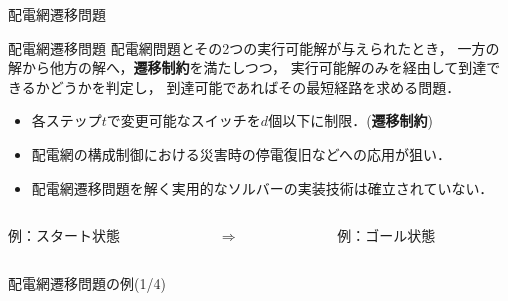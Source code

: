 \documentclass[dvipdfmx,11pt]{beamer}
\begin{document}
\begin{frame}{配電網遷移問題}
 \begin{block}{配電網遷移問題}
  配電網問題とその2つの実行可能解が与えられたとき，
  一方の解から他方の解へ，\alert{\bf 遷移制約}を満たしつつ，
  実行可能解のみを経由して到達できるかどうかを判定し，
  到達可能であればその最短経路を求める問題．
  \begin{itemize}
  \item 各ステップ$t$で変更可能なスイッチを$d$個以下に制限．(\textbf{遷移制約})
  \end{itemize}
 \end{block}
 \begin{itemize}
  \item 配電網の構成制御における災害時の停電復旧などへの応用が狙い．
  \item 配電網遷移問題を解く実用的なソルバーの実装技術は確立されていない．
 \end{itemize}
 \vspace{-0.3cm}
  \begin{columns}
    \begin{column}{0.45\textwidth}\centering
      \begin{exampleblock}{例：スタート状態}
	\centering
	\scalebox{0.25}{}
      \end{exampleblock}
    \end{column}
    \begin{column}{0.05\textwidth}\centering
      $\Rightarrow$
    \end{column}
    \begin{column}{0.45\textwidth}\centering
      \begin{exampleblock}{例：ゴール状態}
        \centering
        \scalebox{0.25}{}
      \end{exampleblock}
    \end{column}
  \end{columns}
\end{frame}
\begin{frame}{配電網遷移問題の例(1/4)}
 \vfill
 \begin{figure}[t]
  \centering
  \scalebox{0.65}{}
  \vspace{-0.1cm}
  \caption*{}
 \end{figure}
\end{frame}
\end{document}
